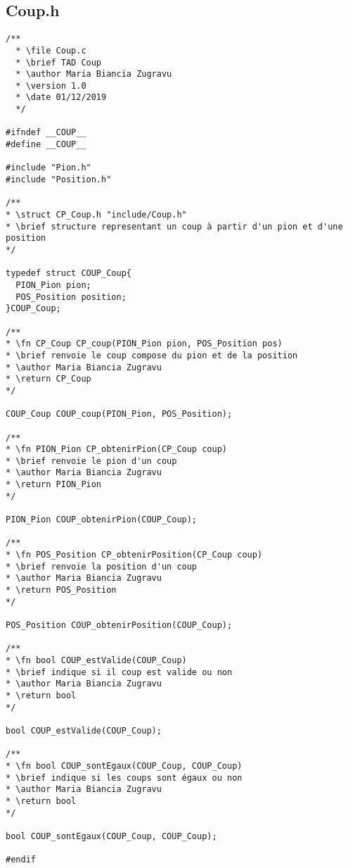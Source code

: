 \subsection{Coup.h}
\begin{lstlisting}
/**
  * \file Coup.c
  * \brief TAD Coup
  * \author Maria Biancia Zugravu
  * \version 1.0
  * \date 01/12/2019
  */

#ifndef __COUP__
#define __COUP__

#include "Pion.h"
#include "Position.h"

/**
* \struct CP_Coup.h "include/Coup.h"
* \brief structure representant un coup à partir d'un pion et d'une position
*/

typedef struct COUP_Coup{
  PION_Pion pion;
  POS_Position position;
}COUP_Coup;

/**
* \fn CP_Coup CP_coup(PION_Pion pion, POS_Position pos)
* \brief renvoie le coup compose du pion et de la position
* \author Maria Biancia Zugravu
* \return CP_Coup
*/

COUP_Coup COUP_coup(PION_Pion, POS_Position);

/**
* \fn PION_Pion CP_obtenirPion(CP_Coup coup)
* \brief renvoie le pion d'un coup
* \author Maria Biancia Zugravu
* \return PION_Pion
*/

PION_Pion COUP_obtenirPion(COUP_Coup);

/**
* \fn POS_Position CP_obtenirPosition(CP_Coup coup)
* \brief renvoie la position d'un coup
* \author Maria Biancia Zugravu
* \return POS_Position
*/

POS_Position COUP_obtenirPosition(COUP_Coup);

/**
* \fn bool COUP_estValide(COUP_Coup)
* \brief indique si il coup est valide ou non
* \author Maria Biancia Zugravu
* \return bool
*/

bool COUP_estValide(COUP_Coup);

/**
* \fn bool COUP_sontEgaux(COUP_Coup, COUP_Coup)
* \brief indique si les coups sont égaux ou non
* \author Maria Biancia Zugravu
* \return bool
*/

bool COUP_sontEgaux(COUP_Coup, COUP_Coup);

#endif
\end{lstlisting}

